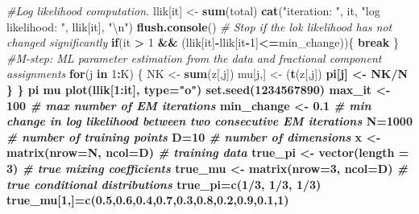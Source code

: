 \documentclass[]{article}
\newenvironment{Shaded}{\begin{snugshade}}{\end{snugshade}}
\newcommand{\KeywordTok}[1]{\textcolor[rgb]{0.13,0.29,0.53}{\textbf{#1}}}
\newcommand{\DataTypeTok}[1]{\textcolor[rgb]{0.13,0.29,0.53}{#1}}
\newcommand{\DecValTok}[1]{\textcolor[rgb]{0.00,0.00,0.81}{#1}}
\newcommand{\FloatTok}[1]{\textcolor[rgb]{0.00,0.00,0.81}{#1}}
\newcommand{\CharTok}[1]{\textcolor[rgb]{0.31,0.60,0.02}{#1}}
\newcommand{\StringTok}[1]{\textcolor[rgb]{0.31,0.60,0.02}{#1}}
\newcommand{\CommentTok}[1]{\textcolor[rgb]{0.56,0.35,0.01}{\textit{#1}}}
\newcommand{\ControlFlowTok}[1]{\textcolor[rgb]{0.13,0.29,0.53}{\textbf{#1}}}
\newcommand{\OperatorTok}[1]{\textcolor[rgb]{0.81,0.36,0.00}{\textbf{#1}}}
\newcommand{\NormalTok}[1]{#1}
\begin{document}
\begin{Shaded}
\begin{Highlighting}[]
{\CommentTok{#Log likelihood computation.}
\NormalTok{llik[it] <-}\StringTok{ }\KeywordTok{sum}\NormalTok{(total)}
\KeywordTok{cat}\NormalTok{(}\StringTok{"iteration: "}\NormalTok{, it, }\StringTok{"log likelihood: "}\NormalTok{, llik[it], }\StringTok{"}\CharTok{\textbackslash{}n}\StringTok{"}\NormalTok{)}
\KeywordTok{flush.console}\NormalTok{()}
\CommentTok{# Stop if the lok likelihood has not changed significantly}
\ControlFlowTok{if}\NormalTok{(it }\OperatorTok{>}\StringTok{ }\DecValTok{1} \OperatorTok{&&}\StringTok{ }\NormalTok{(llik[it]}\OperatorTok{-}\NormalTok{llik[it}\OperatorTok{-}\DecValTok{1}\NormalTok{]}\OperatorTok{<=}\NormalTok{min_change))\{}
\ControlFlowTok{break}
\NormalTok{\}}
\CommentTok{#M-step: ML parameter estimation from the data and fractional component assignments}
\ControlFlowTok{for}\NormalTok{(j }\ControlFlowTok{in} \DecValTok{1}\OperatorTok{:}\NormalTok{K)}
\NormalTok{\{}
\NormalTok{NK <-}\StringTok{ }\KeywordTok{sum}\NormalTok{(z[,j])}
\NormalTok{mu[j,] <-}\StringTok{ }\NormalTok{(}\KeywordTok{t}\NormalTok{(z[,j])}\OperatorTok{%*%}\NormalTok{x)}\OperatorTok{/}\KeywordTok{sum}\NormalTok{(z[,j])}
\NormalTok{pi[j] <-}\StringTok{ }\NormalTok{NK}\OperatorTok{/}\NormalTok{N}
\NormalTok{\}}
\NormalTok{\}}
\NormalTok{pi}
\NormalTok{mu}
\KeywordTok{plot}\NormalTok{(llik[}\DecValTok{1}\OperatorTok{:}\NormalTok{it], }\DataTypeTok{type=}\StringTok{"o"}\NormalTok{)}
\KeywordTok{set.seed}\NormalTok{(}\DecValTok{1234567890}\NormalTok{)}
\NormalTok{max_it <-}\StringTok{ }\DecValTok{100} \CommentTok{# max number of EM iterations}
\NormalTok{min_change <-}\StringTok{ }\FloatTok{0.1} \CommentTok{# min change in log likelihood between two consecutive EM iterations}
\NormalTok{N=}\DecValTok{1000} \CommentTok{# number of training points}
\NormalTok{D=}\DecValTok{10} \CommentTok{# number of dimensions}
\NormalTok{x <-}\StringTok{ }\KeywordTok{matrix}\NormalTok{(}\DataTypeTok{nrow=}\NormalTok{N, }\DataTypeTok{ncol=}\NormalTok{D) }\CommentTok{# training data}
\NormalTok{true_pi <-}\StringTok{ }\KeywordTok{vector}\NormalTok{(}\DataTypeTok{length =} \DecValTok{3}\NormalTok{) }\CommentTok{# true mixing coefficients}
\NormalTok{true_mu <-}\StringTok{ }\KeywordTok{matrix}\NormalTok{(}\DataTypeTok{nrow=}\DecValTok{3}\NormalTok{, }\DataTypeTok{ncol=}\NormalTok{D) }\CommentTok{# true conditional distributions}
\NormalTok{true_pi=}\KeywordTok{c}\NormalTok{(}\DecValTok{1}\OperatorTok{/}\DecValTok{3}\NormalTok{, }\DecValTok{1}\OperatorTok{/}\DecValTok{3}\NormalTok{, }\DecValTok{1}\OperatorTok{/}\DecValTok{3}\NormalTok{)}
\NormalTok{true_mu[}\DecValTok{1}\NormalTok{,]=}\KeywordTok{c}\NormalTok{(}\FloatTok{0.5}\NormalTok{,}\FloatTok{0.6}\NormalTok{,}\FloatTok{0.4}\NormalTok{,}\FloatTok{0.7}\NormalTok{,}\FloatTok{0.3}\NormalTok{,}\FloatTok{0.8}\NormalTok{,}\FloatTok{0.2}\NormalTok{,}\FloatTok{0.9}\NormalTok{,}\FloatTok{0.1}\NormalTok{,}\DecValTok{1}\NormalTok{)}
}}
\end{Highlighting}
\end{Shaded}
\end{document}
